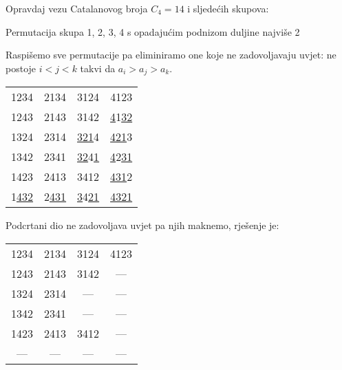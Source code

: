 \documentclass[exam.tex]{subfiles}
\begin{document}
	\begin{subtask}
		Opravdaj vezu Catalanovog broja \( C_4 = 14 \) i sljedećih skupova: 
	
		Permutacija skupa {1, 2, 3, 4} s opadajućim podnizom duljine najviše 2 \\[1em]
	\end{subtask}
	
	Raspišemo sve permutacije pa eliminiramo one koje ne zadovoljavaju uvjet: ne postoje \( i < j < k \) takvi da \( a_i > a_j > a_k \).
	
	\begin{center}
		\begin{tabular}{ cccc } 
	 		1234 & 2134 & 3124 & 4123 \\
			1243 & 2143 & 3142 & \underline{4}1\underline{32} \\
			1324 & 2314 & \underline{321}4 & \underline{421}3 \\
			1342 & 2341 & \underline{32}4\underline{1} & \underline{4}2\underline{31} \\ 
			1423 & 2413 & 3412 & \underline{431}2 \\ 
			1\underline{432} & 2\underline{431} & \underline{3}4\underline{21} & \underline{4321}
		\end{tabular}
	\end{center}
	
	Podcrtani dio ne zadovoljava uvjet pa njih maknemo, rješenje je:
	
	\begin{center}
		\begin{tabular}{ cccc } 
	 		1234 & 2134 & 3124 & 4123 \\
			1243 & 2143 & 3142 & ---  \\
			1324 & 2314 & ---  & ---  \\
			1342 & 2341 & ---  & ---  \\ 
			1423 & 2413 & 3412 & ---  \\ 
			---  & ---  & ---  & ---
		\end{tabular}
	\end{center}
\end{document}
